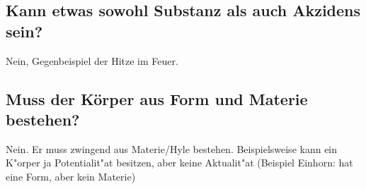 \documentclass[a4paper,12pt]{article}
\begin{document}
\subsection{Kann etwas sowohl Substanz als auch Akzidens sein?}
	Nein, Gegenbeispiel der Hitze im Feuer.
\subsection{Muss der Körper aus Form und Materie bestehen?}
	Nein. Er muss zwingend aus Materie/Hyle bestehen. Beispielsweise kann ein K"orper ja Potentialit"at besitzen, aber keine Aktualit"at (Beispiel Einhorn: hat eine Form, aber kein Materie)
\end{document}
